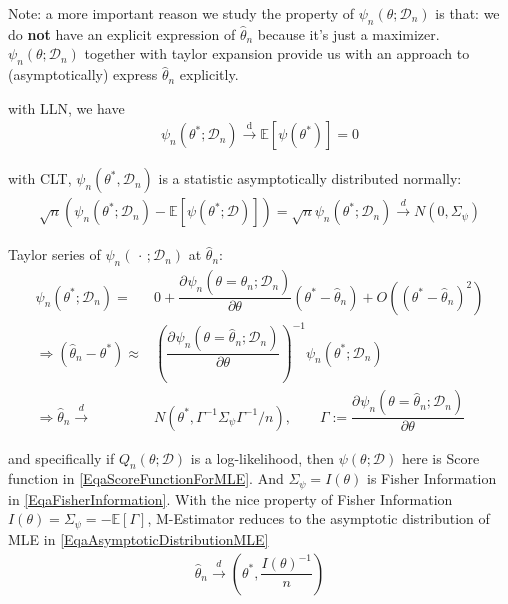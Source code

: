     Note: a more important reason we study the property of $ \psi_n(\theta ;\mathcal{D}_n) $ is that: we do \textbf{not} have an explicit expression of $ \hat{\theta }_n$ because it's just a maximizer. $ \psi_n(\theta ;\mathcal{D}_n) $ together with taylor expansion provide us with an approach to (asymptotically) express $ \hat{\theta }_n $ explicitly.

    with LLN, we have
    \begin{align}
        \psi_n(\theta ^*;\mathcal{D}_n)\xrightarrow[]{\mathrm{d} } \mathbb{E}\left[ \psi(\theta ^*) \right] =0  
    \end{align}

    with CLT, $ \psi_n(\theta ^*,\mathcal{D}_n) $ is a statistic asymptotically distributed normally:
    \begin{align}
        \sqrt{n}\left(\psi_n(\theta ^*;\mathcal{D}_n)-\mathbb{E}\left[ \psi(\theta ^*;\mathcal{D}) \right]\right)=\sqrt{n}\psi_n(\theta ^*;\mathcal{D}_n) \xrightarrow[]{d} N(0,\Sigma _{\psi})
    \end{align}

    Taylor series of $ \psi_n(\, \cdot \, ;\mathcal{D}_n) $ at $ \hat{\theta }_n $:
    \begin{align}
        \psi_n(\theta ^*;\mathcal{D}_n)=& 0 + \dfrac{\partial^{} \psi_n(\theta =\hat{\theta}_n;\mathcal{D}_n)}{\partial \theta ^{}}\left(\theta ^*-\hat{\theta }_n\right)+O((\theta ^*-\hat{\theta }_n)^2)\\
        \Rightarrow \left(\hat{\theta }_n-\theta ^*\right)\approx & \left( \dfrac{\partial^{} \psi_n(\theta =\hat{\theta}_n;\mathcal{D}_n)}{\partial \theta ^{}}\right)^{-1}\psi_n(\theta ^*;\mathcal{D}_n)\\
        \Rightarrow \hat{\theta }_n\xrightarrow[]{d} &N(\theta ^*,\Gamma ^{-1}\Sigma _{\psi}\Gamma ^{-1}\big/n ),\qquad \Gamma :=\dfrac{\partial^{} \psi_n(\theta =\hat{\theta}_n;\mathcal{D}_n)}{\partial \theta ^{}}
    \end{align}

    and specifically if $ Q_n(\theta ;\mathcal{D}) $ is a log-likelihood, then $ \psi(\theta ;\mathcal{D}) $ here is Score function in \autoref{EqaScoreFunctionForMLE}. And $ \Sigma _\psi=I(\theta )  $ is Fisher Information in \autoref{EqaFisherInformation}. With the nice property of Fisher Information $ I(\theta )=\Sigma _{\psi}=-\mathbb{E}\left[ \Gamma  \right]  $, M-Estimator reduces to the asymptotic distribution of MLE in \autoref{EqaAsymptoticDistributionMLE}
    \begin{align}
         \hat{\theta }_n\xrightarrow[]{d} (\theta ^*,\dfrac{ I(\theta )^{-1}}{n})
    \end{align}
    
